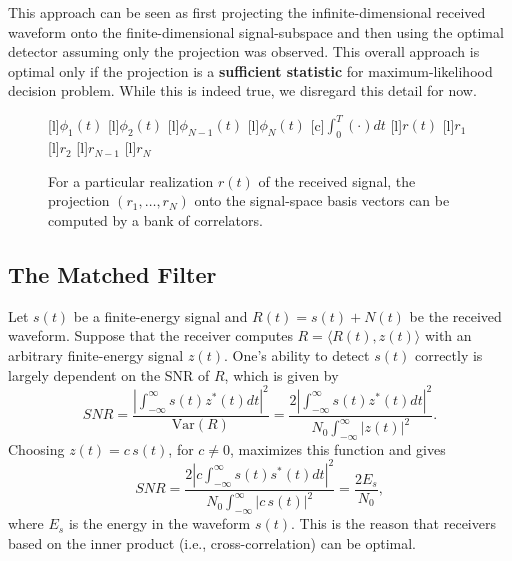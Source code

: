 This approach can be seen as first projecting the infinite-dimensional received waveform onto the finite-dimensional signal-subspace and then using the optimal detector assuming only the projection was observed.
This overall approach is optimal only if the projection is a \textbf{sufficient statistic} for maximum-likelihood decision problem.
While this is indeed true, we disregard this detail for now.

\begin{figure}
\begin{center}
\begin{psfrags}
[l]{$\phi_1(t)$}
[l]{$\phi_2(t)$}
[l]{$\phi_{N-1}(t)$}
[l]{$\phi_N(t)$}
[c]{$\int_{0}^T (\cdot) dt$}
[l]{$r(t)$}
[l]{$r_1$}
[l]{$r_2$}
[l]{$r_{N-1}$}
[l]{$r_N$}
\end{psfrags}
\end{center}
\caption{For a particular realization $r(t)$ of the received signal, the projection $(r_1,\ldots,r_N)$ onto the signal-space basis vectors can be computed by a bank of correlators.}
\end{figure}

\subsection{The Matched Filter}

Let $s(t)$ be a finite-energy signal and $R(t)=s(t)+N(t)$ be the received waveform.
Suppose that the receiver computes $R = \langle R(t), z(t) \rangle$ with an arbitrary finite-energy signal $z(t)$.
One's ability to detect $s(t)$ correctly is largely dependent on the SNR of $R$, which is given by
\[ SNR = \frac{\left|\int_{-\infty}^{\infty} s(t)z^* (t) dt \right|^2}{\mathrm{Var}(R)}
= \frac{2\left|\int_{-\infty}^{\infty} s(t)z^* (t) dt \right|^2}{N_0 \int_{-\infty}^{\infty} \left| z(t) \right|^2}. \]
Choosing $z(t) = c \, s(t)$, for $c\neq 0$, maximizes this function and gives
\[ SNR = \frac{2\left|c \int_{-\infty}^{\infty} s(t) s^* (t) dt \right|^2}{N_0 \int_{-\infty}^{\infty} \left| c\, s(t) \right|^2}
= \frac{2 E_s}{N_0}, \]
where $E_s$ is the energy in the waveform $s(t)$.
This is the reason that receivers based on the inner product (i.e., cross-correlation) can be optimal.

